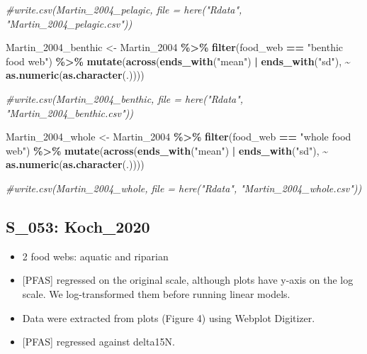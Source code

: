 \documentclass[
]{article}
\newenvironment{Shaded}{\begin{snugshade}}{\end{snugshade}}
\newcommand{\CommentTok}[1]{\textcolor[rgb]{0.56,0.35,0.01}{\textit{#1}}}
\newcommand{\FunctionTok}[1]{\textcolor[rgb]{0.13,0.29,0.53}{\textbf{#1}}}
\newcommand{\NormalTok}[1]{#1}
\newcommand{\OtherTok}[1]{\textcolor[rgb]{0.56,0.35,0.01}{#1}}
\newcommand{\SpecialCharTok}[1]{\textcolor[rgb]{0.81,0.36,0.00}{\textbf{#1}}}
\newcommand{\StringTok}[1]{\textcolor[rgb]{0.31,0.60,0.02}{#1}}
\providecommand{\tightlist}{%
  \setlength{\itemsep}{0pt}\setlength{\parskip}{0pt}}
\begin{document}
\begin{Shaded}
\begin{Highlighting}[]
\CommentTok{\#write.csv(Martin\_2004\_pelagic, file = here("Rdata", "Martin\_2004\_pelagic.csv"))}

\NormalTok{Martin\_2004\_benthic }\OtherTok{\textless{}{-}}\NormalTok{ Martin\_2004 }\SpecialCharTok{\%\textgreater{}\%} 
  \FunctionTok{filter}\NormalTok{(food\_web }\SpecialCharTok{==} \StringTok{"benthic food web"}\NormalTok{) }\SpecialCharTok{\%\textgreater{}\%}
  \FunctionTok{mutate}\NormalTok{(}\FunctionTok{across}\NormalTok{(}\FunctionTok{ends\_with}\NormalTok{(}\StringTok{"mean"}\NormalTok{) }\SpecialCharTok{|} \FunctionTok{ends\_with}\NormalTok{(}\StringTok{"sd"}\NormalTok{), }\SpecialCharTok{\textasciitilde{}} \FunctionTok{as.numeric}\NormalTok{(}\FunctionTok{as.character}\NormalTok{(.))))}

\CommentTok{\#write.csv(Martin\_2004\_benthic, file = here("Rdata", "Martin\_2004\_benthic.csv"))}

\NormalTok{Martin\_2004\_whole }\OtherTok{\textless{}{-}}\NormalTok{ Martin\_2004 }\SpecialCharTok{\%\textgreater{}\%}
  \FunctionTok{filter}\NormalTok{(food\_web }\SpecialCharTok{==} \StringTok{"whole food web"}\NormalTok{) }\SpecialCharTok{\%\textgreater{}\%}
  \FunctionTok{mutate}\NormalTok{(}\FunctionTok{across}\NormalTok{(}\FunctionTok{ends\_with}\NormalTok{(}\StringTok{"mean"}\NormalTok{) }\SpecialCharTok{|} \FunctionTok{ends\_with}\NormalTok{(}\StringTok{"sd"}\NormalTok{), }\SpecialCharTok{\textasciitilde{}} \FunctionTok{as.numeric}\NormalTok{(}\FunctionTok{as.character}\NormalTok{(.))))}

\CommentTok{\#write.csv(Martin\_2004\_whole, file = here("Rdata", "Martin\_2004\_whole.csv"))}
\end{Highlighting}
\end{Shaded}

\subsection{S\_053: Koch\_2020}\label{s_053-koch_2020}

\begin{itemize}
\tightlist
\item
  2 food webs: aquatic and riparian
\item
  {[}PFAS{]} regressed on the original scale, although plots have y-axis
  on the log scale. We log-transformed them before running linear
  models.
\item
  Data were extracted from plots (Figure 4) using Webplot Digitizer.
\item
  {[}PFAS{]} regressed against delta15N.
\end{itemize}
\end{document}
